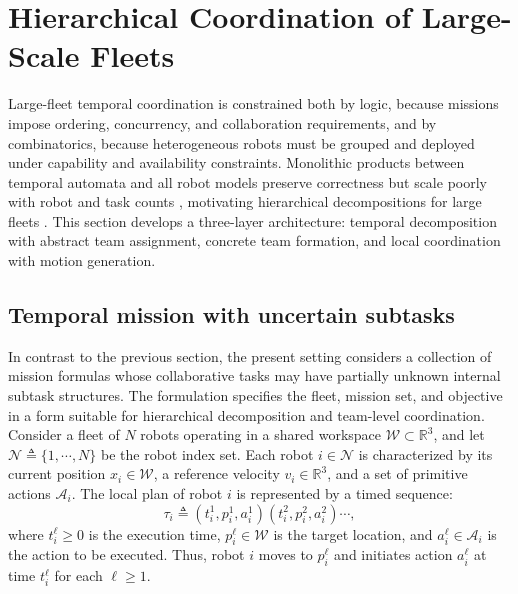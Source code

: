 \section{Hierarchical Coordination of Large-Scale Fleets}\label{ch04:subsec:task}

Large-fleet temporal coordination is constrained both by logic, because missions
impose ordering, concurrency, and collaboration requirements, and by
combinatorics, because heterogeneous robots must be grouped and deployed under
capability and availability constraints. Monolithic products between temporal
automata and all robot models preserve correctness but scale poorly with robot
and task counts
\citep{kantaros2020stylus,schillinger2018simultaneous,luo2022temporal,
leahy2021scalable}, motivating hierarchical decompositions for large fleets
\citep{chen2025realtime,liu2024time,luo2025simultaneous,gosrich2025online,
luo2025hulk}. This section develops a three-layer architecture: temporal
decomposition with abstract team assignment, concrete team formation, and local
coordination with motion generation.

\subsection{Temporal mission with uncertain subtasks}
\label{ch04:subsec:uncertain_mission}

In contrast to the previous section, the present setting considers a collection
of mission formulas whose collaborative tasks may have partially unknown
internal subtask structures. The formulation specifies the fleet, mission set,
and objective in a form suitable for hierarchical decomposition and team-level
coordination.
Consider a fleet of $N$ robots operating in a shared workspace
$\mathcal{W}\subset\mathbb{R}^{3}$, and let
$\mathcal{N}\triangleq\{1,\cdots,N\}$ be the robot index set. Each robot
$i\in\mathcal{N}$ is characterized by its current position
$x_i\in\mathcal{W}$, a reference velocity $v_i\in\mathbb{R}^{3}$, and a set of
primitive actions $\mathcal{A}_i$. The local plan of robot $i$ is represented
by a timed sequence:
\begin{equation}
\label{ch04:eq:tau}
\tau_i \triangleq
(t_i^1,p_i^1,a_i^1)(t_i^2,p_i^2,a_i^2)\cdots,
\end{equation}
where $t_i^\ell\geq 0$ is the execution time, $p_i^\ell\in\mathcal{W}$ is the
target location, and $a_i^\ell\in\mathcal{A}_i$ is the action to be executed.
Thus, robot $i$ moves to $p_i^\ell$ and initiates action $a_i^\ell$ at time
$t_i^\ell$ for each $\ell\geq 1$.

